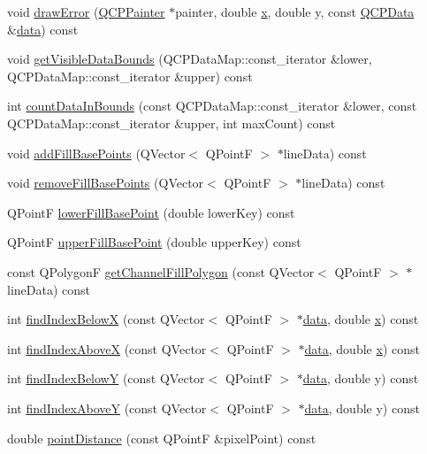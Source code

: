 \begin{DoxyCompactItemize}
\item 
void \hyperlink{classQCPGraph_a4df6807066ce877705e999773e7ffbc4}{draw\+Error} (\hyperlink{classQCPPainter}{Q\+C\+P\+Painter} $\ast$painter, double \hyperlink{qualification__task_8cpp_a6150e0515f7202e2fb518f7206ed97dc}{x}, double y, const \hyperlink{classQCPData}{Q\+C\+P\+Data} \&\hyperlink{classQCPGraph_a2f58436df4f86a2792b776a21642b3d9}{data}) const 
\item 
void \hyperlink{classQCPGraph_a6a317cb14a83dae0841c7041a63d6d9d}{get\+Visible\+Data\+Bounds} (Q\+C\+P\+Data\+Map\+::const\+\_\+iterator \&lower, Q\+C\+P\+Data\+Map\+::const\+\_\+iterator \&upper) const 
\item 
int \hyperlink{classQCPGraph_a13f6a3aa60227e03ab1f7aa8eec6589f}{count\+Data\+In\+Bounds} (const Q\+C\+P\+Data\+Map\+::const\+\_\+iterator \&lower, const Q\+C\+P\+Data\+Map\+::const\+\_\+iterator \&upper, int max\+Count) const 
\item 
void \hyperlink{classQCPGraph_a5fa7884620d7c54b81dfbd255d97b636}{add\+Fill\+Base\+Points} (Q\+Vector$<$ Q\+PointF $>$ $\ast$line\+Data) const 
\item 
void \hyperlink{classQCPGraph_ad31b49a90e91e538fd9caf011c913a68}{remove\+Fill\+Base\+Points} (Q\+Vector$<$ Q\+PointF $>$ $\ast$line\+Data) const 
\item 
Q\+PointF \hyperlink{classQCPGraph_a41f982e8ceaefe6a53eb7432f26d64b6}{lower\+Fill\+Base\+Point} (double lower\+Key) const 
\item 
Q\+PointF \hyperlink{classQCPGraph_a363d066c179e0f46cc93c12bafb0bfba}{upper\+Fill\+Base\+Point} (double upper\+Key) const 
\item 
const Q\+PolygonF \hyperlink{classQCPGraph_a0374b7268e35cab9802a6be2b5d726d7}{get\+Channel\+Fill\+Polygon} (const Q\+Vector$<$ Q\+PointF $>$ $\ast$line\+Data) const 
\item 
int \hyperlink{classQCPGraph_a6f4e9461d5925be9228fc4760249a04f}{find\+Index\+BelowX} (const Q\+Vector$<$ Q\+PointF $>$ $\ast$\hyperlink{classQCPGraph_a2f58436df4f86a2792b776a21642b3d9}{data}, double \hyperlink{qualification__task_8cpp_a6150e0515f7202e2fb518f7206ed97dc}{x}) const 
\item 
int \hyperlink{classQCPGraph_abab2a75b5e63630432bdd1f3b57f07fa}{find\+Index\+AboveX} (const Q\+Vector$<$ Q\+PointF $>$ $\ast$\hyperlink{classQCPGraph_a2f58436df4f86a2792b776a21642b3d9}{data}, double \hyperlink{qualification__task_8cpp_a6150e0515f7202e2fb518f7206ed97dc}{x}) const 
\item 
int \hyperlink{classQCPGraph_a6c4d556de3d1e02f548401001f72c6ff}{find\+Index\+BelowY} (const Q\+Vector$<$ Q\+PointF $>$ $\ast$\hyperlink{classQCPGraph_a2f58436df4f86a2792b776a21642b3d9}{data}, double y) const 
\item 
int \hyperlink{classQCPGraph_adf50243f1df203883a2187089734bfcb}{find\+Index\+AboveY} (const Q\+Vector$<$ Q\+PointF $>$ $\ast$\hyperlink{classQCPGraph_a2f58436df4f86a2792b776a21642b3d9}{data}, double y) const 
\item 
double \hyperlink{classQCPGraph_af93762a12a481a7edb4b3dd9e330dff1}{point\+Distance} (const Q\+PointF \&pixel\+Point) const 
\end{DoxyCompactItemize}

